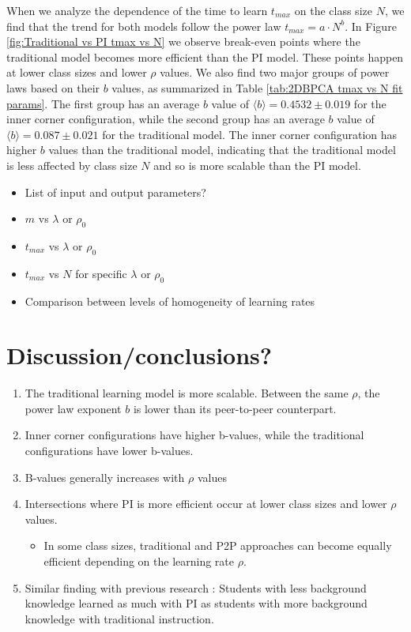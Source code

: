 When we analyze the dependence of the time to learn $t_{max}$ on the class size $N$, we find that the trend for both models follow the power law $t_{max} = a \cdot N^b$. In Figure \ref{fig:Traditional vs PI tmax vs N} we observe break-even points where the traditional model becomes more efficient than the PI model. These points happen at lower class sizes and lower $\rho$ values. We also find two major groups of power laws based on their $b$ values, as summarized in Table \ref{tab:2DBPCA tmax vs N fit params}. The first group has an average $b$ value of $\langle b \rangle = 0.4532 \pm 0.019$ for the inner corner configuration, while the second group has an average $b$ value of $\langle b \rangle = 0.087\pm0.021$ for the traditional model. The inner corner configuration has higher $b$ values than the traditional model, indicating that the traditional model is less affected by class size $N$ and so is more scalable than the PI model.

\begin{itemize}
    \item List of input and output parameters?
    \item $m$ vs $\lambda$ or $\rho_0$
    \item $t_{max}$ vs $\lambda$ or $\rho_0$
    \item $t_{max}$ vs $N$ for specific $\lambda$ or $\rho_0$
    \item Comparison between levels of homogeneity of learning rates
\end{itemize}

\section{Discussion/conclusions?}
\begin{enumerate}
    \item The traditional learning model is more scalable. Between the same $\rho$, the power law exponent $b$ is lower than its peer-to-peer counterpart.
    \item Inner corner configurations have higher b-values, while the traditional configurations have lower b-values.
    \item B-values generally increases with $\rho$ values
    \item Intersections where PI is more efficient occur at lower class sizes and lower $\rho$ values.
    
    \begin{itemize}
        \item In some class sizes, traditional and P2P approaches can become equally efficient depending on the learning rate $\rho$.
    \end{itemize}

    \item Similar finding with previous research \cite{lasry2008peer}: Students with less background knowledge learned as much with PI as students with more background knowledge with traditional instruction.

\end{enumerate}

    
